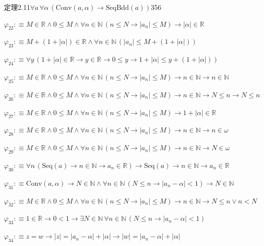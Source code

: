 \begin{fullproof}{定理2.11}{$\forall a\,\forall \alpha\,(\mathrm{Conv}(a,\alpha) \to \mathrm{SeqBdd}(a))$}{356}
\begin{abbrevlist}
\item $\varphi_{22} :\equiv M \in \mathbb{R} \land 0 \leq M \land \forall n \in \mathbb{N}\,(n \leq N \to \lvert a_{n} \rvert \leq M) \to \lvert \alpha \rvert \in \mathbb{R}$
\item $\varphi_{23} :\equiv M + (1 + \lvert \alpha \rvert) \in \mathbb{R} \land \forall n \in \mathbb{N}\,(\lvert a_{n} \rvert \leq M + (1 + \lvert \alpha \rvert))$
\item $\varphi_{24} :\equiv \forall y\,(1 + \lvert \alpha \rvert \in \mathbb{R} \to y \in \mathbb{R} \to 0 \leq y \to 1 + \lvert \alpha \rvert \leq y + (1 + \lvert \alpha \rvert))$
\item $\varphi_{25} :\equiv M \in \mathbb{R} \land 0 \leq M \land \forall n \in \mathbb{N}\,(n \leq N \to \lvert a_{n} \rvert \leq M) \to n \in \mathbb{N} \to n \in \mathbb{N}$
\item $\varphi_{26} :\equiv M \in \mathbb{R} \land 0 \leq M \land \forall n \in \mathbb{N}\,(n \leq N \to \lvert a_{n} \rvert \leq M) \to n \in \mathbb{N} \to N \leq n \to N \leq n$
\item $\varphi_{27} :\equiv M \in \mathbb{R} \land 0 \leq M \land \forall n \in \mathbb{N}\,(n \leq N \to \lvert a_{n} \rvert \leq M) \to 1 + \lvert \alpha \rvert \in \mathbb{R}$
\item $\varphi_{28} :\equiv M \in \mathbb{R} \land 0 \leq M \land \forall n \in \mathbb{N}\,(n \leq N \to \lvert a_{n} \rvert \leq M) \to n \in \mathbb{N} \to n \in \omega$
\item $\varphi_{29} :\equiv M \in \mathbb{R} \land 0 \leq M \land \forall n \in \mathbb{N}\,(n \leq N \to \lvert a_{n} \rvert \leq M) \to n \in \mathbb{N} \to N \in \omega$
\item $\varphi_{30} :\equiv \forall n\,(\mathrm{Seq}(a) \to n \in \mathbb{N} \to a_{n} \in \mathbb{R}) \to \mathrm{Seq}(a) \to n \in \mathbb{N} \to a_{n} \in \mathbb{R}$
\item $\varphi_{31} :\equiv \mathrm{Conv}(a,\alpha) \to N \in \mathbb{N} \land \forall n \in \mathbb{N}\,(N \leq n \to \lvert a_{n} - \alpha \rvert < 1) \to N \in \mathbb{N}$
\item $\varphi_{32} :\equiv M \in \mathbb{R} \land 0 \leq M \land \forall n \in \mathbb{N}\,(n \leq N \to \lvert a_{n} \rvert \leq M) \to n \in \mathbb{N} \to N \leq n \lor n < N$
\item $\varphi_{33} :\equiv 1 \in \mathbb{R} \to 0 < 1 \to \exists N \in \mathbb{N}\,\forall n \in \mathbb{N}\,(N \leq n \to \lvert a_{n} - \alpha \rvert < 1)$
\item $\varphi_{34} :\equiv z = w \to \lvert z \rvert = \lvert a_{n} - \alpha \rvert + \lvert \alpha \rvert \to \lvert w \rvert = \lvert a_{n} - \alpha \rvert + \lvert \alpha \rvert$

\end{abbrevlist}
\end{fullproof}

